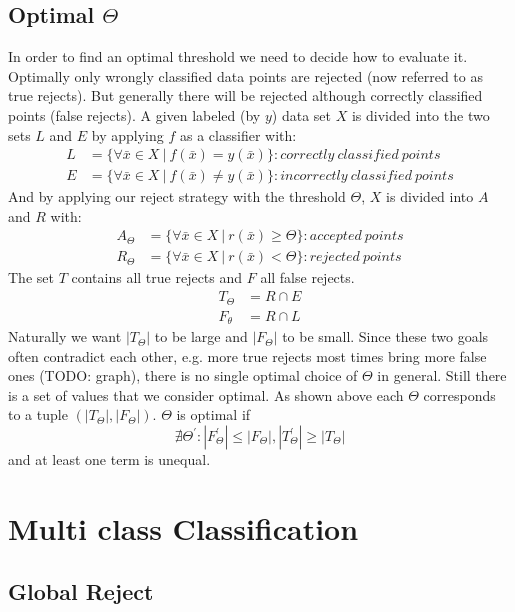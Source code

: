 \subsection{Optimal $\Theta$}
In order to find an optimal threshold we need to decide how to evaluate it. Optimally only wrongly classified data points are rejected (now referred to as true rejects). But generally there will be rejected although correctly classified points (false rejects). 
A given labeled (by $y$) data set $X$ is divided into the two sets $L$ and $E$ by applying $f$ as a classifier with:
\begin{align} 
L&=\{\forall \bar{x} \in X \ | \ f(\bar{x}) = y(\bar{x})\} : correctly \ classified \ points \\
E&=\{\forall \bar{x} \in X \ | \ f(\bar{x}) \neq y(\bar{x})\} : incorrectly \ classified \ points \end{align}
And by applying our reject strategy with the threshold $\Theta$, $X$ is divided into $A$ and $R$ with:
\begin{align} 
A_\Theta&=\{\forall \bar{x} \in X \ | \ r(\bar{x}) \geq \Theta \} : accepted \ points \\
R_\Theta&=\{\forall \bar{x} \in X \ | \ r(\bar{x}) < \Theta\} : rejected \ points 
\end{align}
The set $T$ contains all true rejects and $F$ all false rejects.
\begin{align} 
T_\Theta &= R \cap E \\ 
F_\theta &= R \cap L
\end{align}
Naturally we want $|T_\Theta|$ to be large and $|F_\Theta|$ to be small. Since these two goals often contradict each other, e.g. more true rejects most times bring more false ones (TODO: graph), there is no single optimal choice of $\Theta$ in general. Still there is a set of values that we consider optimal. As shown above each $\Theta$ corresponds to a tuple $(|T_\Theta|,|F_\Theta|)$. $\Theta$ is optimal if
$$ \nexists \Theta^{'} : |F_\Theta^{'}|\leq|F_\Theta|, |T_\Theta^{'}|\geq|T_\Theta| $$ and at least one term is unequal. 

\section{Multi class Classification}

\subsection{Global Reject}

